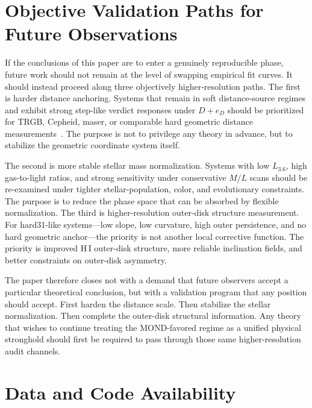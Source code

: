 ﻿\documentclass[aps,prd,twocolumn,superscriptaddress,longbibliography,nofootinbib,floatfix,10pt]{revtex4-2}
\begin{document}
\section{Objective Validation Paths for Future Observations}

If the conclusions of this paper are to enter a genuinely reproducible phase,
future work should not remain at the level of swapping empirical fit curves. It
should instead proceed along three objectively higher-resolution paths. The
first is harder distance anchoring. Systems that remain in soft distance-source
regimes and exhibit strong step-like verdict responses under $D+e_D$ should be
prioritized for TRGB, Cepheid, maser, or comparable hard geometric distance
measurements~\cite{MadoreMagerFreedman2009}. The purpose is not to privilege
any theory in advance, but to stabilize the geometric coordinate system itself.

The second is more stable stellar mass normalization. Systems with low
$L_{3.6}$, high gas-to-light ratios, and strong sensitivity under conservative
$M/L$ scans should be re-examined under tighter stellar-population, color, and
evolutionary constraints. The purpose is to reduce the phase space that can be
absorbed by flexible normalization. The third is higher-resolution outer-disk
structure measurement. For hard31-like systems---low slope, low curvature, high
outer persistence, and no hard geometric anchor---the priority is not another
local corrective function. The priority is improved H\,I outer-disk
structure, more reliable inclination fields, and better constraints on
outer-disk asymmetry.

The paper therefore closes not with a demand that future observers accept a
particular theoretical conclusion, but with a validation program that any
position should accept. First harden the distance scale. Then stabilize the
stellar normalization. Then complete the outer-disk structural information.
Any theory that wishes to continue treating the MOND-favored regime as a
unified physical stronghold should first be required to pass through those same
higher-resolution audit channels.

\section{Data and Code Availability}
\end{document}
